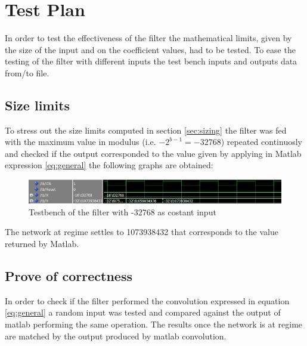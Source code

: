 \section{Test Plan}
In order to test the effectiveness of the filter the mathematical limits, given by the size of the input and on the coefficient values, had to be tested.
To ease the testing of the filter with different inputs the test bench inputs and outputs data from/to file.
\subsection{Size limits}
To stress out the size limits computed in section \ref{sec:sizing} the filter was fed with the maximum value in modulus (i.e. $-2^{b-1}= -32768 $) repeated continuosly and checked if the output corresponded to the value given by applying in Matlab expression \ref{eq:general} the following graphs are obtained:
\begin{figure}[H]
  \centering
  \includegraphics[width=0.9\linewidth]{./images/simul32768.PNG}
  \caption{Testbench of the filter with -32768 as costant input}
  \label{fig:32768}
\end{figure}
The network at regime settles to 1073938432 that corresponds to the value returned by Matlab.
\subsection{Prove of correctness}
In order to check if the filter performed the convolution expressed in equation \ref{eq:general} a random input was tested and compared against the output of matlab performing the same operation. The results once the network is at regime are matched by the output produced by matlab convolution.
